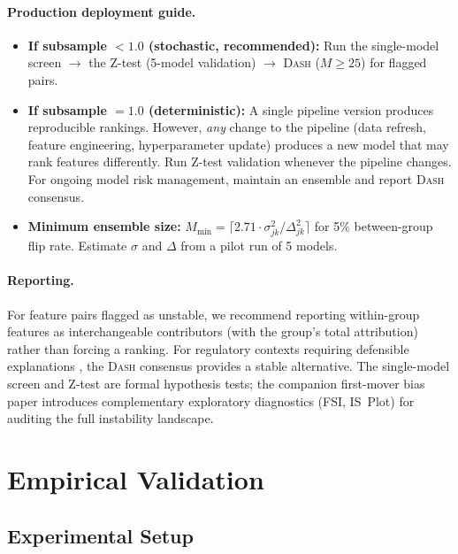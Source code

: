 \documentclass{jmlr}
\newcommand{\DASH}{\textsc{Dash}}
\begin{document}
\paragraph{Production deployment guide.}
\begin{itemize}
    \item \textbf{If subsample $< 1.0$ (stochastic, recommended):} Run the single-model screen $\to$ the Z-test (5-model validation) $\to$ \DASH{} ($M \geq 25$) for flagged pairs.
    \item \textbf{If subsample $= 1.0$ (deterministic):} A single pipeline version produces reproducible rankings. However, \emph{any} change to the pipeline (data refresh, feature engineering, hyperparameter update) produces a new model that may rank features differently. Run Z-test validation whenever the pipeline changes. For ongoing model risk management, maintain an ensemble and report \DASH{} consensus.
    \item \textbf{Minimum ensemble size:} $M_{\min} = \lceil 2.71 \cdot \sigma_{jk}^2/\Delta_{jk}^2 \rceil$ for 5\% between-group flip rate. Estimate $\sigma$ and $\Delta$ from a pilot run of 5 models.
\end{itemize}

\paragraph{Reporting.}
For feature pairs flagged as unstable, we recommend reporting within-group features as interchangeable contributors (with the group's total attribution) rather than forcing a ranking. For regulatory contexts requiring defensible explanations \citep{occ2011sr117}, the \DASH{} consensus provides a stable alternative. The single-model screen and Z-test are formal hypothesis tests; the companion first-mover bias paper introduces complementary exploratory diagnostics (FSI, IS~Plot) for auditing the full instability landscape.


\section{Empirical Validation}
\label{sec:experiments}

\subsection{Experimental Setup}
\end{document}
